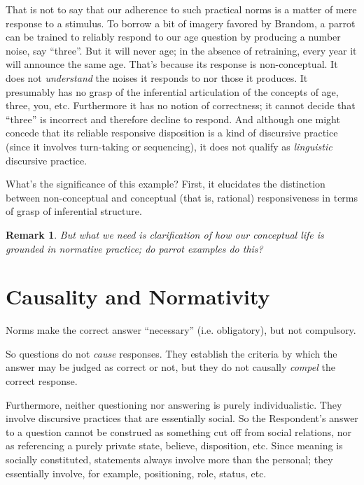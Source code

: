 \documentclass[11pt,twoside]{article}
\newtheorem{remark}{Remark}
\newcommand{\R}{Respondent}
\begin{document}
That is not to say that our adherence to such practical norms is a
matter of mere response to a stimulus.  To borrow a bit of imagery
favored by Brandom, a parrot can be trained to reliably respond to our
age question by producing a number noise, say \enquote{three}.  But it
will never age; in the absence of retraining, every year it will
announce the same age.  That's because its response is non-conceptual.
It does not \textit{understand} the noises it responds to nor those it
produces.  It presumably has no grasp of the inferential articulation
of the concepts of age, three, you, etc.  Furthermore it has no notion
of correctness; it cannot decide that ``three'' is incorrect and
therefore decline to respond.  And although one might concede that its
reliable responsive disposition is a kind of discursive practice
(since it involves turn-taking or sequencing), it does not qualify as
\textit{linguistic} discursive practice.

What's the significance of this example?  First, it elucidates the
distinction between non-conceptual and conceptual (that is, rational)
responsiveness in terms of grasp of inferential structure.

\begin{remark}
  But what we need is clarification of how our conceptual life is
  grounded in normative practice; do parrot examples do this?
\end{remark}

\section{Causality and Normativity}

Norms make the correct answer \enquote{necessary} (i.e. obligatory),
but not compulsory.

So questions do not \textit{cause} responses.  They establish the
criteria by which the answer may be judged as correct or not, but they
do not causally \textit{compel} the correct response.

Furthermore, neither questioning nor answering is purely
individualistic.  They involve discursive practices that are
essentially social.  So the \R{}'s answer to a question cannot be
construed as something cut off from social relations, nor as
referencing a purely private state, believe, disposition, etc.  Since
meaning is socially constituted, statements always involve more than
the personal; they essentially involve, for example, positioning,
role, status, etc.
\end{document}
